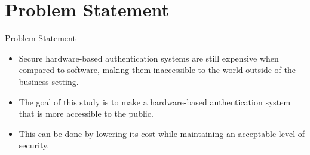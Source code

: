\section{Problem Statement}
\begin{frame}{Problem Statement}
\begin{itemize}
    \item<1-> Secure hardware-based authentication systems are still expensive when compared to software, making them inaccessible to the world outside of the business setting.
    \item<2-> The goal of this study is to make a hardware-based authentication system that is more accessible to the public.
    \item<3-> This can be done by lowering its cost while maintaining an acceptable level of security.
\end{itemize}
\end{frame}